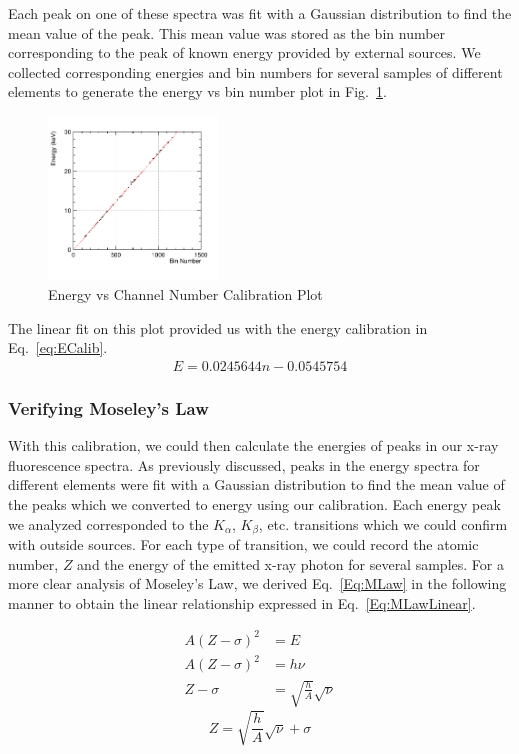 \documentclass[%
 reprint,
 amsmath,amssymb,
 aps,
 pra,
]{revtex4-1}
\begin{document}
Each peak on one of these spectra was fit with a Gaussian distribution to find the mean value of the peak. This mean value was stored as the bin number corresponding to the peak of known energy provided by external sources. \cite{xrfdata} We collected corresponding energies and bin numbers for several samples of different elements to generate the energy vs bin number plot in Fig.~\ref{Fig:Evsbin}.

\begin{figure}[H]
	\centering
	\includegraphics[width=0.4\textwidth]{EvsBin.png}
	\caption{Energy vs Channel Number Calibration Plot}
	\label{Fig:Evsbin}
\end{figure}

The linear fit on this plot provided us with the energy calibration in Eq.~\ref{eq:ECalib}.
\begin{gather}\label{eq:ECalib}
	E = 0.0245644n - 0.0545754
\end{gather}

\subsubsection{Verifying Moseley's Law}

With this calibration, we could then calculate the energies of peaks in our x-ray fluorescence spectra. As previously discussed, peaks in the energy spectra for different elements were fit with a Gaussian distribution to find the mean value of the peaks which we converted to energy using our calibration. Each energy peak we analyzed corresponded to the $K_{\alpha}$, $K_{\beta}$, etc. transitions which we could confirm with outside sources. For each type of transition, we could record the atomic number, $Z$ and the energy of the emitted x-ray photon for several samples. For a more clear analysis of Moseley's Law, we derived Eq.~\ref{Eq:MLaw} in the following manner to obtain the linear relationship expressed in Eq.~\ref{Eq:MLawLinear}.

\begin{align*}
A(Z - \sigma)^{2} &= E\\
A(Z - \sigma)^{2} &= h \nu\\
Z - \sigma &= \sqrt{\frac{h}{A}}\sqrt{\nu}
\end{align*}
\begin{equation}\label{Eq:MLawLinear}
Z = \sqrt{\frac{h}{A}}\sqrt{\nu} + \sigma
\end{equation}
\end{document}
